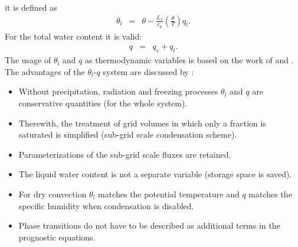 \documentclass[11pt,a4paper]{scrartcl}
\begin{document}
it is defined as 
\begin{eqnarray}
 \theta_{l} & = & \theta -\frac{L_{v}}{c_{p}}\left(\frac{\theta}{T}\right)q_{l}.
 \label{eq:theta_l}
\end{eqnarray}
For the total water content it is valid:
\begin{eqnarray}
 q & = & q_{v}+q_{l}.
 \label{eq:q}
\end{eqnarray}
The usage of $\theta_{l}$ and $q$ as thermodynamic variables is based on the work of \cite{ogura63} and \cite{orville65}. The advantages of the 
$\theta_l$-$q$ system are discussed by \cite{deardorff76}:
\begin{itemize}
 \item Without precipitation, radiation and freezing processes $\theta_{l}$ and $q$ are conservative quantities (for the whole system).
 \item Therewith, the treatment of grid volumes in which only a fraction is saturated is simplified (sub-grid scale condensation scheme).
 \item Parameterizations of the sub-grid scale fluxes are retained. 
 \item The liquid water content is not a separate variable (storage space is saved).
 \item For dry convection $\theta_{l}$ matches the potential temperature and $q$ matches the specific humidity when condensation is disabled.
 \item Phase transitions do not have to be described as additional terms in the prognostic equations.
\end{itemize}
\end{document}
